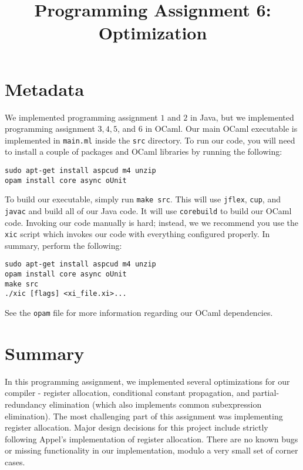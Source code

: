 \documentclass{hw}
\title{Programming Assignment 6:\\ Optimization}
\begin{document}
\maketitle

\section{Metadata}\label{sec:metadata}
We implemented programming assignment $1$ and $2$ in Java, but we implemented
programming assignment $3,4,5$, and $6$ in OCaml. Our main OCaml executable is
implemented in \texttt{main.ml} inside the \texttt{src} directory. To run our
code, you will need to install a couple of packages and OCaml libraries by
running the following:

\begin{center}
\begin{BVerbatim}
sudo apt-get install aspcud m4 unzip
opam install core async oUnit
\end{BVerbatim}
\end{center}

To build our executable, simply run \texttt{make src}. This will use
\texttt{jflex}, \texttt{cup}, and \texttt{javac} and build all of our Java
code. It will use \texttt{corebuild} to build our OCaml code. Invoking our
code manually is hard; instead, we we recommend you use the \texttt{xic} script
which invokes our code with everything configured properly. 
In summary, perform the following:

\begin{center}
\begin{BVerbatim}
sudo apt-get install aspcud m4 unzip
opam install core async oUnit
make src
./xic [flags] <xi_file.xi>...
\end{BVerbatim}
\end{center}

See the \texttt{opam} file for more information regarding our OCaml dependencies.


\section{Summary}\label{sec:summary}
In this programming assignment, we implemented several optimizations for our compiler - register allocation, conditional constant propagation, and partial-redundancy elimination (which also implements common subexpression elimination).
The most challenging part of this assignment was implementing register allocation. Major design decisions for this project include strictly following Appel's implementation of register allocation. %
There are no known bugs or missing functionality in our implementation, modulo a very
small set of corner cases.
\end{document}
